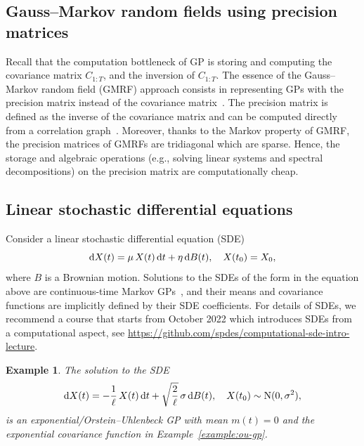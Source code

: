 \documentclass[]{article}
\newtheorem{example}[theorem]{Example}
\begin{document}
\subsection{Gauss--Markov random fields using precision matrices}
Recall that the computation bottleneck of GP is storing and computing the covariance matrix $C_{1:T}$, and the inversion of $C_{1:T}$. The essence of the Gauss--Markov random field (GMRF) approach consists in representing GPs with the precision matrix instead of the covariance matrix~\citep{Rue2005}. The precision matrix is defined as the inverse of the covariance matrix and can be computed directly from a correlation graph~\citep[see, e.g.,][Thm. 2.3]{Rue2005}. Moreover, thanks to the Markov property of GMRF, the precision matrices of GMRFs are tridiagonal which are sparse. Hence, the storage and algebraic operations (e.g., solving linear systems and spectral decompositions) on the precision matrix are computationally cheap.

\subsection{Linear stochastic differential equations}
\label{sec:sde-gp}
Consider a linear stochastic differential equation (SDE)
%
\begin{equation}
	\mathop{}\!\mathrm{d} X(t) = \mu \, X(t) \mathop{}\!\mathrm{d} t + \eta \mathop{}\!\mathrm{d} B(t), \quad X(t_0) = X_0,
	\label{equ:linear-sde}
\end{equation}
%
where $B$ is a Brownian motion. Solutions to the SDEs of the form in the equation above are continuous-time Markov GPs~\citep[][Sec. 5.6]{Karatzas1991}, and their means and covariance functions are implicitly defined by their SDE coefficients. For details of SDEs, we recommend a course that starts from October 2022 which introduces SDEs from a computational aspect, see \url{https://github.com/spdes/computational-sde-intro-lecture}.

\begin{example}
	\label{example:sde-ou}
	The solution to the SDE
	\begin{equation*}
		\mathop{}\!\mathrm{d} X(t) = -\frac{1}{\ell} \, X(t) \mathop{}\!\mathrm{d} t + \sqrt{\frac{2}{\ell}} \, \sigma \mathop{}\!\mathrm{d} B(t), \quad X(t_0) \sim \mathrm{N}(0, \sigma^2),
	\end{equation*}
	is an exponential/Orstein--Uhlenbeck GP with mean $m(t) = 0$ and the exponential covariance function in Example~\ref{example:ou-gp}. 
\end{example}
\end{document}
